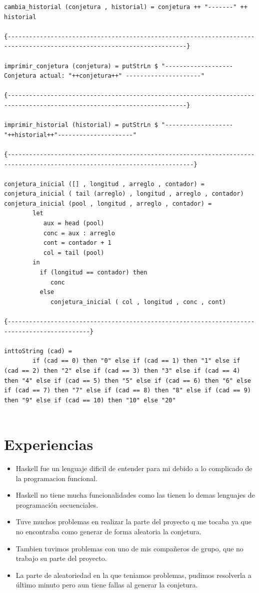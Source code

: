 \begin{itemize}
\begin{verbatim}
cambia_historial (conjetura , historial) = conjetura ++ "-------" ++ historial 

{------------------------------------------------------------------------------------------------------------------------}

imprimir_conjetura (conjetura) = putStrLn $ "-------------------Conjetura actual: "++conjetura++" ---------------------"

{------------------------------------------------------------------------------------------------------------------------}

imprimir_historial (historial) = putStrLn $ "------------------- "++historial++"---------------------"

{--------------------------------------------------------------------------------------------------------------------------}

conjetura_inicial ([] , longitud , arreglo , contador) = conjetura_inicial ( tail (arreglo) , longitud , arreglo , contador)
conjetura_inicial (pool , longitud , arreglo , contador) = 
        let
           aux = head (pool)
           conc = aux : arreglo
           cont = contador + 1
           col = tail (pool)
        in
          if (longitud == contador) then
             conc
          else
             conjetura_inicial ( col , longitud , conc , cont)
         
{---------------------------------------------------------------------------------------------}

inttoString (cad) =
        if (cad == 0) then "0" else if (cad == 1) then "1" else if (cad == 2) then "2" else if (cad == 3) then "3" else if (cad == 4) then "4" else if (cad == 5) then "5" else if (cad == 6) then "6" else if (cad == 7) then "7" else if (cad == 8) then "8" else if (cad == 9) then "9" else if (cad == 10) then "10" else "20"


     \end{verbatim}

  \end{itemize}

\section{Experiencias}
\begin{itemize}
\item Haskell fue un lenguaje dificil de entender para mi debido a lo complicado de la programacion funcional.
\item Haskell no tiene mucha funcionalidades como las tienen lo demas lenguajes de programación secuenciales.
\item Tuve muchos problemas en realizar la parte del proyecto q me tocaba ya que no encontraba como generar de forma aleatoria la conjetura.
\item Tambien tuvimos problemas con uno de mis compañeros de grupo, que no trabajo su parte del proyecto.
\item La parte de aleatoriedad en la que teniamos problemas, pudimos resolverla a último minuto pero aun tiene fallas al generar la conjetura.
 \end{itemize}

%

